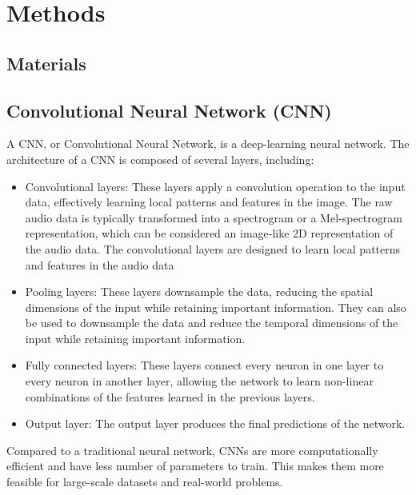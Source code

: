 \chapter{Methods}

\section{Materials}

\section{Convolutional Neural Network (CNN)}

A CNN, or Convolutional Neural Network, is a deep-learning neural network. The architecture of a CNN is composed of several layers, including:

\begin{itemize}

\item Convolutional layers: These layers apply a convolution operation to the input data, effectively learning local patterns and features in the image. The raw audio data is typically transformed into a spectrogram or a Mel-spectrogram representation, which can be considered an image-like 2D representation of the audio data. The convolutional layers are designed to learn local patterns and features in the audio data
\vspace*{3mm}

\item Pooling layers: These layers downsample the data, reducing the spatial dimensions of the input while retaining important information. They can also be used to downsample the data and reduce the temporal dimensions of the input while retaining important information. 
\vspace*{3mm}

\item Fully connected layers: These layers connect every neuron in one layer to every neuron in another layer, allowing the network to learn non-linear combinations of the features learned in the previous layers.
\vspace*{3mm}

\item Output layer: The output layer produces the final predictions of the network.
\end{itemize}

Compared to a traditional neural network, CNNs are more computationally efficient and have less number of parameters to train. This makes them more feasible for large-scale datasets and real-world problems.

